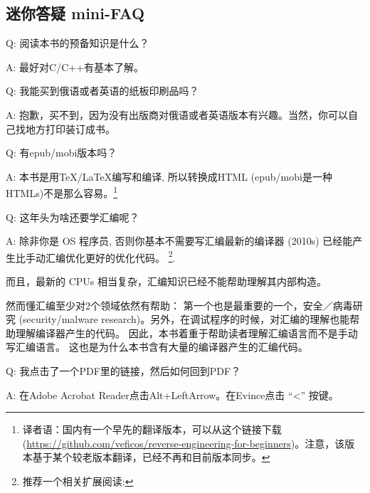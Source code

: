 \documentclass[UTF8,nofonts]{ctexart}
\begin{document}

\subsection*{迷你答疑 mini-FAQ}



\par Q: 阅读本书的预备知识是什么？
\par A: 最好对C/C++有基本了解。
\par Q: 我能买到俄语或者英语的纸板印刷品吗？
\par A: 抱歉，买不到，因为没有出版商对俄语或者英语版本有兴趣。当然，你可以自己找地方打印装订成书。

\par Q: 有epub/mobi版本吗？
\par A: 本书是用TeX/LaTeX编写和编译, 所以转换成HTML (epub/mobi是一种HTMLs)不是那么容易。\footnote{译者语：国内有一个早先的翻译版本，可以从这个链接下载 (\url{https://github.com/veficos/reverse-engineering-for-beginners})。注意，该版本基于某个较老版本翻译，已经不再和目前版本同步。}


\par Q: 这年头为啥还要学汇编呢？
\par A: 除非你是 \ac{OS} 程序员, 否则你基本不需要写汇编\textemdash{}最新的编译器 (2010s) 已经能产生比手动汇编优化更好的优化代码。 \footnote{推荐一个相关扩展阅读: \InSqBrackets{\AgnerFog}}.

而且，最新的 \ac{CPU}s 相当复杂，汇编知识已经不能帮助理解其内部构造。

然而懂汇编至少对2个领域依然有帮助：
第一个也是最重要的一个，安全／病毒研究 (security/malware research)。另外，在调试程序的时候，对汇编的理解也能帮助理解编译器产生的代码。
因此，本书着重于帮助读者理解汇编语言而不是手动写汇编语言。
这也是为什么本书含有大量的编译器产生的汇编代码。

\par Q: 我点击了一个PDF里的链接，然后如何回到PDF？
\par A: 在Adobe Acrobat Reader点击Alt+LeftArrow。在Evince点击 ``<'' 按键。
\end{document}
